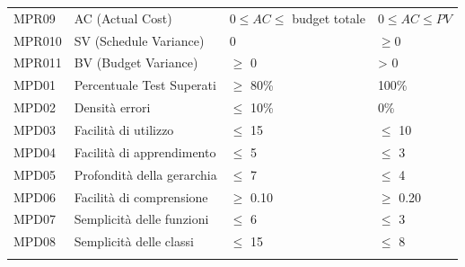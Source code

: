 \begin{center}
\begin{longtable}[!h]{p{45px} p{200px} p{105px} p{80px}}
        MPR09                                & AC (Actual Cost)                                        & $0 \leq AC \leq$ budget totale    & $0 \leq AC \leq PV$           \\
        MPR010                               & SV (Schedule Variance)                                  & 0                                 & $\geq 0$                      \\
        MPR011                               & BV (Budget Variance)                                    & $\geq$ 0                          & > 0                           \\
        MPD01                                & Percentuale Test Superati                               & $\geq$ 80\%                       & 100\%                         \\
        MPD02                                & Densità errori                                          & $\leq$ 10\%                       & 0\%                           \\
        MPD03                                & Facilità di utilizzo                                    & $\leq$ 15                         & $\leq$ 10                     \\
        MPD04                                & Facilità di apprendimento                               & $\leq$ 5                          & $\leq$ 3                      \\
        MPD05                                & Profondità della gerarchia                              & $\leq$ 7                          & $\leq$ 4                      \\
        MPD06                                & Facilità di comprensione                                & $\geq$ 0.10                       & $\geq$ 0.20                   \\
        MPD07                                & Semplicità delle funzioni                               & $\leq$ 6                          & $\leq$ 3                      \\
        MPD08                                & Semplicità delle classi                                 & $\leq$ 15                         & $\leq$ 8                      \\
        \rowcolor{white}
    \end{longtable}
\end{center}
